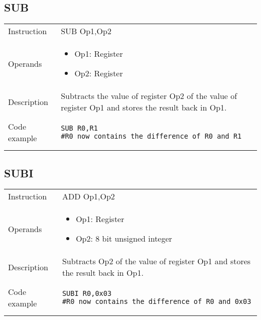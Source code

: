 \newpage

\subsection{SUB}
\renewcommand*{\arraystretch}{2.0}
\begin{longtable}{P{3cm}P{9cm}}
\midrule
\noindent Instruction & SUB Op1,Op2 \\
\noindent Operands &
\begin{itemize}[label={},noitemsep,leftmargin=*,topsep=0pt,partopsep=0pt, itemsep=1em]
\item Op1: Register
\item Op2: Register
\end{itemize}\\
\noindent Description & Subtracts the value of register Op2 of the value of register Op1 and stores the result back in Op1.
	 \\
\noindent Code example & 
\begin{lstlisting}
SUB R0,R1
#R0 now contains the difference of R0 and R1
\end{lstlisting} \\
\end{longtable}


\subsection{SUBI}
\renewcommand*{\arraystretch}{2.0}
\begin{longtable}{P{3cm}P{9cm}}
\midrule
\noindent Instruction & ADD Op1,Op2 \\
\noindent Operands &
\begin{itemize}[label={},noitemsep,leftmargin=*,topsep=0pt,partopsep=0pt, itemsep=1em]
\item Op1: Register
\item Op2: 8 bit unsigned integer
\end{itemize}\\
\noindent Description & Subtracts Op2 of the value of register Op1 and stores the result back in Op1.
	 \\
\noindent Code example & 
\begin{lstlisting}
SUBI R0,0x03
#R0 now contains the difference of R0 and 0x03
\end{lstlisting} \\
\end{longtable}

\newpage

